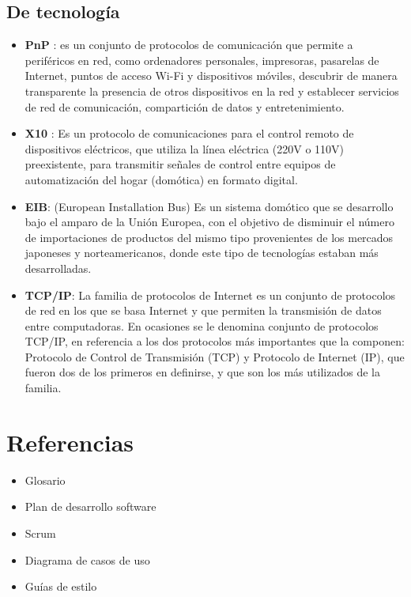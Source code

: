     \subsection{De tecnología}
    	\begin{itemize}
    		\item {\bf PnP }: es un conjunto de protocolos de comunicación que permite a periféricos en red, como ordenadores personales, impresoras, pasarelas de Internet, puntos de acceso Wi-Fi y dispositivos móviles, descubrir de manera transparente la presencia de otros dispositivos en la red y establecer servicios de red de comunicación, compartición de datos y entretenimiento.
    		\item {\bf X10 }: Es un protocolo de comunicaciones para el control remoto de dispositivos eléctricos, que utiliza la línea eléctrica (220V o 110V) preexistente, para transmitir señales de control entre equipos de automatización del hogar (domótica) en formato digital.
    		\item {\bf EIB}: (European Installation Bus) Es un sistema domótico que se desarrollo bajo el
    		amparo de la Unión Europea, con el objetivo de disminuir el número de importaciones de
    		productos del mismo tipo provenientes de los mercados japoneses y norteamericanos,
    		donde este tipo de tecnologías estaban más desarrolladas.
    		\item {\bf TCP/IP}: La familia de protocolos de Internet es un conjunto de protocolos de red en los que se basa Internet y que permiten la transmisión de datos entre computadoras. En ocasiones se le denomina conjunto de protocolos TCP/IP, en referencia a los dos protocolos más importantes que la componen: Protocolo de Control de Transmisión (TCP) y Protocolo de Internet (IP), que fueron dos de los primeros en definirse, y que son los más utilizados de la familia. 
    	\end{itemize}
    	

\section{Referencias}
    \begin{itemize}
        \item Glosario
        \item Plan de desarrollo software
        \item Scrum
        \item Diagrama de casos de uso
        \item Guías de estilo
    \end{itemize}
